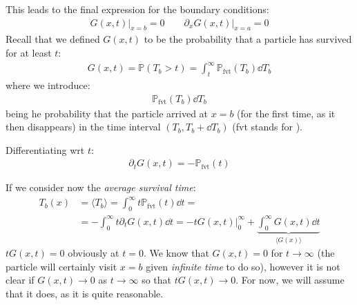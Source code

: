 \documentclass[../template.tex]{subfiles}
\begin{document}
This leads to the final expression for the boundary conditions:
\begin{align*}
    G(x,t)\Big|_{x=b} = 0 \qquad \partial_x G(x,t) \Big|_{x=a} = 0
\end{align*} 
Recall that we defined $G(x,t)$ to be the probability that a particle has survived for at least $t$:
\begin{align*}
    G(x,t) = \mathbb{P}(T_b > t) = \int_t^{\infty} \mathbb{P}_{\mathrm{fvt}}(T_b) \dd{T_b}
\end{align*}   
where we introduce:
\begin{align*}
    \mathbb{P}_{\mathrm{fvt} } (T_b) \dd{T_b}
\end{align*}
being he probability that the particle arrived at $x=b$ (for the first time, as it then disappears) in the time interval $(T_b, T_b + \dd{T_b})$ (fvt stands for ).

Differentiating wrt $t$:
\begin{align}
    \partial_t G(x,t) = - \mathbb{P}_{\mathrm{fvt} } (t)
    \label{eqn:Gtt}
\end{align} 

If we consider now the \textit{average survival time}:
\begin{align*}
    T_b(x) &= \langle T_b \rangle = \int_0^\infty t \mathbb{P}_{\mathrm{fvt} }(t) \dd{t} = \\
    &= -\int_0^\infty t \partial_t G(x,t) \dd{t} = -t G(x,t)\Big|_0^\infty + \underbrace{\int_0^\infty G(x,t) \dd{t}}_{\langle G(x) \rangle} 
\end{align*} 
$tG(x,t) = 0$ obviously at $t=0$. We know that $G(x,t) = 0$ for $t \to \infty$ (the particle will certainly visit $x=b$ given \textit{infinite time} to do so), however it is not clear if $G(x,t) \to 0$ as $t \to \infty$  so that $t G(x,t) \to 0$. For now, we will assume that it does, as it is quite reasonable.
\end{document}
